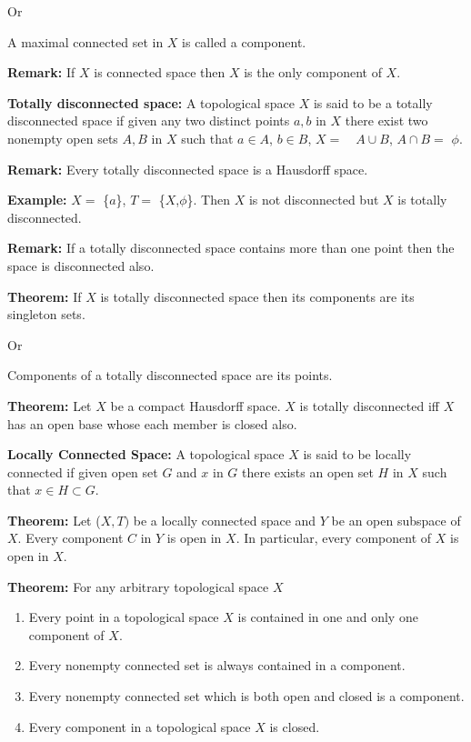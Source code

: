 \documentclass[12pt]{amsart}
\begin{document}
Or

A maximal connected set in $X$ is called a component.

\textbf{Remark:} If $X$ is connected space then $X$ is the only component of $X$.

\textbf{Totally disconnected space:} A topological space $X$ is said to be a 
totally disconnected space if given any two distinct points $a, b$ in $X$ there exist 
two nonempty open sets $A, B$ in $X$ such that $a\in A$, $b\in B$, $X = \quad A\cup B$, $A\cap B =$ 
$\phi $.

\textbf{Remark:} Every totally disconnected space is a Hausdorff space.

\textbf{Example:} $X =$ {\{}$a${\}}, $T =$ {\{}$X$,$\phi ${\}}. Then $X$ is not disconnected 
but $X$ is totally disconnected.

\textbf{Remark:} If a totally disconnected space contains more than one 
point then the space is disconnected also.

\textbf{Theorem:} If $X$ is totally disconnected space then its components are 
its singleton sets.

Or

Components of a totally disconnected space are its points.

\textbf{Theorem:} Let $X$ be a compact Hausdorff space. $X$ is totally 
disconnected iff $X$ has an open base whose each member is closed also.

\textbf{Locally Connected Space: }A topological space $X$ is said to be locally 
connected if given open set $G$ and $x$ in $G$ there exists an open set $H$ in $X$ such 
that $x\in H\subset G$.

\textbf{Theorem:} Let ($X, T)$ be a locally connected space and $Y$ be an open 
subspace of $X$. Every component $C$ in $Y$ is open in $X$. In particular, every 
component of $X$ is open in $X$.

\textbf{Theorem:} For any arbitrary topological space $X$

\begin{enumerate}
\item Every point in a topological space $X$ is contained in one and only one component of $X$.
\item Every nonempty connected set is always contained in a component.
\item Every nonempty connected set which is both open and closed is a component. 
\item Every component in a topological space $X$ is closed.
\end{enumerate}
\end{document}
